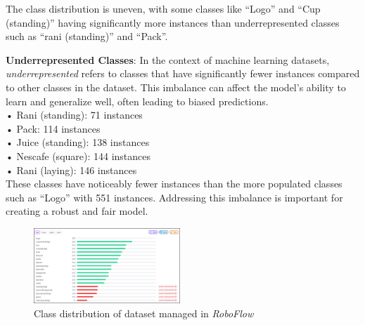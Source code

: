 \documentclass[conference]{IEEEtran}
\begin{document}
The class distribution is uneven, with some classes like ``Logo'' and ``Cup (standing)'' having significantly more instances than underrepresented classes such as ``rani (standing)'' and ``Pack''.

\textbf{Underrepresented Classes}: In the context of machine learning datasets, \textit{underrepresented} refers to classes that have significantly fewer instances compared to other classes in the dataset. This imbalance can affect the model's ability to learn and generalize well, often leading to biased predictions. \\
•	Rani (standing): 71 instances \\
•	Pack: 114 instances \\
•	Juice (standing): 138 instances \\
•	Nescafe (square): 144 instances \\
•	Rani (laying): 146 instances \\

These classes have noticeably fewer instances than the more populated classes such as ``Logo'' with 551 instances. Addressing this imbalance is important for creating a robust and fair model.

\begin{figure}[htbp]
  \centering
  \includegraphics[width=0.49\textwidth]{figures/prob3-a.png}
  \caption{Class distribution of dataset managed in \textit{RoboFlow}}
  \label{fig:prob3-a}
\end{figure}
\end{document}
